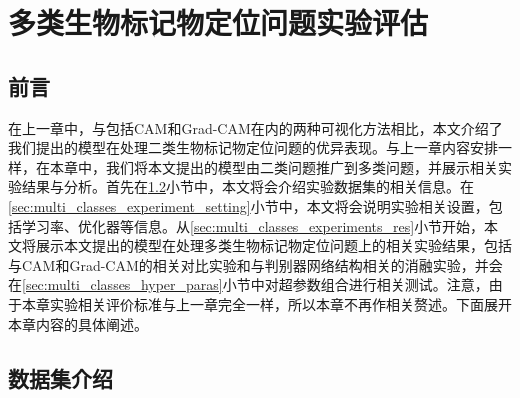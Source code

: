 \chapter{多类生物标记物定位问题实验评估}\label{sec:multi_classes}
\section{前言}
在上一章中，与包括CAM和Grad-CAM在内的两种可视化方法相比，本文介绍了我们提出的模型在处理二类生物标记物定位问题的优异表现。与上一章内容安排一样，在本章中，我们将本文提出的模型由二类问题推广到多类问题，并展示相关实验结果与分析。首先在\ref{sec:mul_classes_ds_intro}小节中，本文将会介绍实验数据集的相关信息。在\ref{sec:multi_classes_experiment_setting}小节中，本文将会说明实验相关设置，包括学习率、优化器等信息。从\ref{sec:multi_classes_experiments_res}小节开始，本文将展示本文提出的模型在处理多类生物标记物定位问题上的相关实验结果，包括与CAM和Grad-CAM的相关对比实验和与判别器网络结构相关的消融实验，并会在\ref{sec:multi_classes_hyper_paras}小节中对超参数组合进行相关测试。注意，由于本章实验相关评价标准与上一章完全一样，所以本章不再作相关赘述。下面展开本章内容的具体阐述。
\section{数据集介绍}\label{sec:mul_classes_ds_intro}
